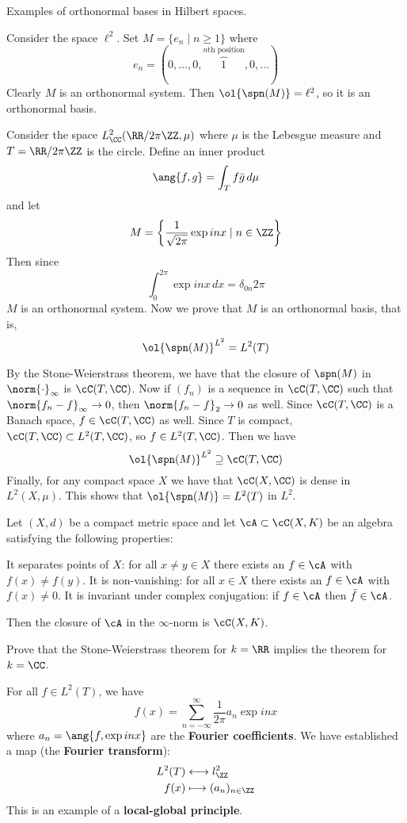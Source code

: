 \begin{exam}
	Examples of orthonormal bases in Hilbert spaces.
	\begin{enum}
		\io
		Consider the space $\ell^2$.
		Set $M = \{e_n \mid n \geq 1\}$ where
		\[e_n = (0,\ldots,0,\overbrace{1}^{n\text{th position}},0,\ldots)\]
		Clearly $M$ is an orthonormal system.
		Then $\ol{\spn(M)} = \ell^2$, so it is an orthonormal basis.
		
		\io
		Consider the space $L^2_\CC(\RR/2\pi\ZZ, \mu)$ where $\mu$ is the Lebesgue measure and $T = \RR/2\pi\ZZ$ is the circle.
		Define an inner product
		\[\ang{f,g} = \int_T f \bar g \, d\mu\]
		and let
		\[M = \left\{\frac 1{\sqrt{2\pi}} \exp inx \mid n \in \ZZ \right\}\]
		Then since
		\[\int_0^{2\pi} \exp inx \, dx = \delta_{0n}2\pi\]
		$M$ is an orthonormal system.
		Now we prove that $M$ is an orthonormal basis, that is,
		\[\ol{\spn(M)}^{L^2} = L^2(T)\]
		
		By the Stone-Weierstrass theorem, we have that the closure of $\spn(M)$ in $\norm{\cdot}_\infty$ is $\cC(T,\CC)$.
		Now if $(f_n)$ is a sequence in $\cC(T,\CC)$ such that $\norm{f_n-f}_\infty \to 0$, then $\norm{f_n-f}_2 \to 0$ as well.
		Since $\cC(T,\CC)$ is a Banach space, $f \in \cC(T,\CC)$ as well.
		Since $T$ is compact, $\cC(T,\CC) \subset L^2(T,\CC)$, so $f \in L^2(T,\CC)$.
		Then we have
		\[\ol{\spn(M)}^{L^2} \supseteq \cC(T,\CC)\]
		Finally, for any compact space $X$ we have that $\cC(X,\CC)$ is dense in $L^2(X,\mu)$.
		This shows that $\ol{\spn(M)} = L^2(T)$ in $L^2$.
	\end{enum}
\end{exam}

\begin{thm}
	Let $(X,d)$ be a compact metric space and let $\cA \subset \cC(X,K)$ be an algebra satisfying the following properties:
	\begin{enum}
		\io It separates points of $X$: for all $x \neq y \in X$ there exists an $f \in \cA$ with $f(x) \neq f(y)$.
		\io It is non-vanishing: for all $x \in X$ there exists an $f \in \cA$ with $f(x) \neq 0$.
		\io It is invariant under complex conjugation: if $f \in \cA$ then $\bar f \in \cA$.
	\end{enum}
	Then the closure of $\cA$ in the $\infty$-norm is $\cC(X,K)$.
\end{thm}

\begin{exer}
	Prove that the Stone-Weierstrass theorem for $k=\RR$ implies the theorem for $k=\CC$.
\end{exer}

\begin{rmk}
	For all $f \in L^2(T)$, we have
	\[f(x) = \sum_{n=-\infty}^\infty \frac 1{2\pi} a_n\exp inx\]
	where $a_n=\ang{f,\exp inx}$ are the \textbf{Fourier coefficients}.
	We have established a map (the \textbf{Fourier transform}):
	\begin{align*}
		L^2(T) &\longleftrightarrow l_\ZZ^2 \\
		f(x) &\longmapsto (a_n)_{n \in \ZZ}
	\end{align*}
	This is an example of a \textbf{local-global principle}.
\end{rmk}